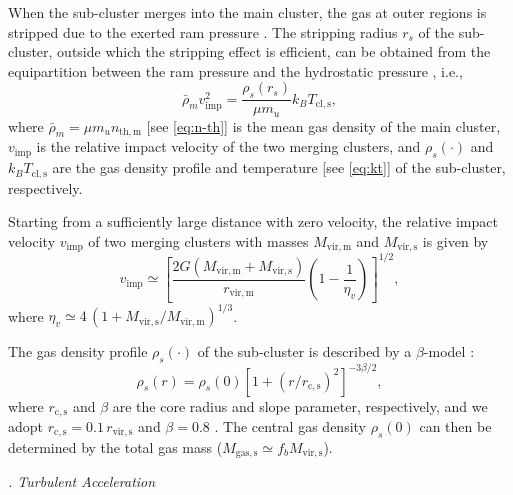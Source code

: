 \documentclass[twocolumn]{aastex62}
\newcommand{\R}[1]{\mathrm{#1}}
\newcommand{\editwip}[1]{{\leavevmode\color{magenta}#1}}
\newcounter{sssseccount}
\newcommand{\sssseclabel}{\alph{sssseccount}}
\newcommand{\ssssec}[1]{%
  \vspace{1ex}%
  \stepcounter{sssseccount}%
  \noindent\emph{\sssseclabel. #1}%
}
\begin{document}
\editwip{%
When the sub-cluster merges into the main cluster, the gas at outer regions
is stripped due to the exerted ram pressure \citep{gunn1972}.
The stripping radius $r_s$ of the sub-cluster, outside which the stripping
effect is efficient, can be obtained from the equipartition between the ram
pressure and the hydrostatic pressure \citep{cassano2005}, i.e.,
\begin{equation}
  \label{eq:rs-eqp}
  \bar{\rho}_m v_{\R{imp}}^2 = \frac{\rho_s(r_s)}{\mu m_u} k_B T_{\R{cl,s}},
\end{equation}
where
$\bar{\rho}_m = \mu m_u n_{\R{th,m}}$ [see \autoref{eq:n-th}] is the mean
gas density of the main cluster,
$v_{\R{imp}}$ is the relative impact velocity of the two merging clusters,
and $\rho_s(\cdot)$ and $k_B T_{\R{cl,s}}$ are the gas density profile and
temperature [see \autoref{eq:kt}] of the sub-cluster, respectively.

Starting from a sufficiently large distance with zero velocity,
the relative impact velocity $v_{\R{imp}}$ of two merging clusters with
masses $M_{\R{vir,m}}$ and $M_{\R{vir,s}}$ is given by
\citep{sarazin2002,cassano2005}
\begin{equation}
  \label{eq:v-imp}
  v_{\R{imp}} \simeq \left[
    \frac{2G (M_{\R{vir,m}} + M_{\R{vir,s}})}{r_{\R{vir,m}}}
    \left( 1 - \frac{1}{\eta_v} \right)\right]^{1/2},
\end{equation}
where $\eta_v \simeq 4 \,(1 + M_{\R{vir,s}}/M_{\R{vir,m}})^{1/3}$.

The gas density profile $\rho_s(\cdot)$ of the sub-cluster is described by
a $\beta$-model \citep{cavaliere1976}:
\begin{equation}
  \label{eq:beta-model}
  \rho_s(r) = \rho_s(0) \left[1 + (r / r_{\R{c,s}})^2 \right]^{-3\beta/2},
\end{equation}
where $r_{\R{c,s}}$ and $\beta$ are the core radius and slope parameter,
respectively, and we adopt $r_{\R{c,s}} = 0.1 \,r_{\R{vir,s}}$ and
$\beta = 0.8$ \citep{cassano2005}.
The central gas density $\rho_s(0)$ can then be determined by the total gas
mass ($M_{\R{gas,s}} \simeq f_b M_{\R{vir,s}}$).
} %

\ssssec{Turbulent Acceleration}
\end{document}
